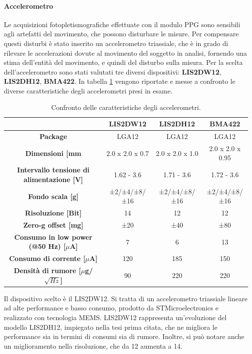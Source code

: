 \paragraph{Accelerometro} 
Le acquisizioni fotopletismografiche effettuate con il modulo PPG sono sensibili agli artefatti del movimento, che possono disturbare le misure. Per compensare questi disturbi è stato inserito un accelerometro triassiale, che  è in grado di rilevare le accelerazioni dovute al movimento del soggetto in analisi, fornendo una stima dell'entità del movimento, e quindi del disturbo sulla misura.
Per la scelta dell'accelerometro sono stati valutati tre diversi dispositivi: \textbf{LIS2DW12}\cite{STElectronicsLIS2DW12}, \textbf{LIS2DH12}\cite{STMicroelectronics2017}, \textbf{BMA422}\cite{BoshBMA422}. In tabella \ref{tab:ConfrontoAccelerometri} vengono riportate e messe a confronto le diverse caratteristiche degli accelerometri presi in esame.
\begin{table}[h]
	\renewcommand{\arraystretch}{1.5}
	\centering
	\footnotesize
	\begin{tabular}{cccc}
		\hline & \textbf{LIS2DW12} & \textbf{LIS2DH12} & \textbf{BMA422} \\ \hline
		\textbf{Package} & LGA12 & LGA12 & LGA12 \\ \hline
		\textbf{Dimensioni {[}mm\ap{2}{]}}& 2.0 x 2.0 x 0.7 & 2.0 x 2.0 x 1.0 & 2.0 x 2.0 x 0.95\\\hline
		\textbf{Intervallo tensione di alimentazione {[}V{]}}&1.62 - 3.6&1.71 - 3.6&1.72 - 3.6\\ \hline
		\textbf{Fondo scala [g]} &  ±2/±4/±8/±16   &    ±2/±4/±8/±16   &   ±2/±4/±8/±16 \\ \hline
		\textbf{Risoluzione [Bit]} &   14   &    12     & 12 \\ \hline
		\textbf{Zero-g offset [mg]} &   ±20   &    ±40     & ±80 \\ \hline		
		\textbf{Consumo in low power (@50 Hz) {[}$\mu$A{]}} &   7   &    6     &   13\\ \hline
		\textbf{Consumo di corrente {[}$\mu$A{]}} &   120   &    185     &   150\\ \hline
		\textbf{Densità di rumore {[}$\mu$g/$\sqrt{Hz}${]}} &  90   &    220     &   220\\ \hline
	\end{tabular}
	\caption{Confronto delle caratteristiche degli accelerometri.}
	\label{tab:ConfrontoAccelerometri}
\end{table}
Il dispositivo scelto è il LIS2DW12. Si tratta di un accelerometro triassiale lineare ad alte performance e basso consumo, prodotto da STMicroelectronics e realizzato con tecnologia MEMS. LIS2DW12 rappresenta un'evoluzione del modello LIS2DH12, impiegato nella tesi prima citata\cite{Ingegneria2018}, che ne migliora le performance sia in termini di consumi sia di rumore. Inoltre, si può notare anche un miglioramento nella risoluzione, che da \SI{12}{\bit} aumenta a \SI{14}{\bit}.

